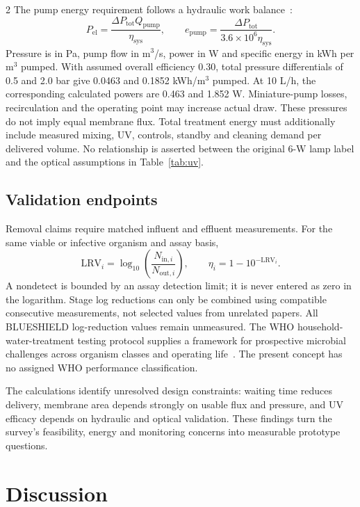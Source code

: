 \documentclass{ieeeaccess}
\begin{document}
\begin{multicols}{2}
The pump energy requirement follows a hydraulic work balance~\cite{doe_pump2005}:
\begin{equation}
P_{\mathrm{el}}=\frac{\Delta P_{\mathrm{tot}}Q_{\mathrm{pump}}}{\eta_{\mathrm{sys}}},\qquad
e_{\mathrm{pump}}=\frac{\Delta P_{\mathrm{tot}}}{3.6\times10^6\eta_{\mathrm{sys}}}.
\label{eq:energy}
\end{equation}
Pressure is in Pa, pump flow in m$^3$/s, power in W and specific energy in kWh per m$^3$ pumped. With assumed overall efficiency 0.30, total pressure differentials of 0.5 and 2.0 bar give 0.0463 and 0.1852 kWh/m$^3$ pumped. At 10 L/h, the corresponding calculated powers are 0.463 and 1.852 W. Miniature-pump losses, recirculation and the operating point may increase actual draw. These pressures do not imply equal membrane flux. Total treatment energy must additionally include measured mixing, UV, controls, standby and cleaning demand per delivered volume. No relationship is asserted between the original 6-W lamp label and the optical assumptions in Table~\ref{tab:uv}.

\subsection{Validation endpoints}
Removal claims require matched influent and effluent measurements. For the same viable or infective organism and assay basis,
\begin{equation}
\mathrm{LRV}_i=\log_{10}\left(\frac{N_{\mathrm{in},i}}{N_{\mathrm{out},i}}\right),\qquad
\eta_i=1-10^{-\mathrm{LRV}_i}.
\label{eq:lrv}
\end{equation}
A nondetect is bounded by an assay detection limit; it is never entered as zero in the logarithm. Stage log reductions can only be combined using compatible consecutive measurements, not selected values from unrelated papers. All BLUESHIELD log-reduction values remain unmeasured. The WHO household-water-treatment testing protocol supplies a framework for prospective microbial challenges across organism classes and operating life~\cite{who_hwt2018}. The present concept has no assigned WHO performance classification.

The calculations identify unresolved design constraints: waiting time reduces delivery, membrane area depends strongly on usable flux and pressure, and UV efficacy depends on hydraulic and optical validation. These findings turn the survey's feasibility, energy and monitoring concerns into measurable prototype questions.


\section{Discussion}


\end{multicols}
\end{document}
